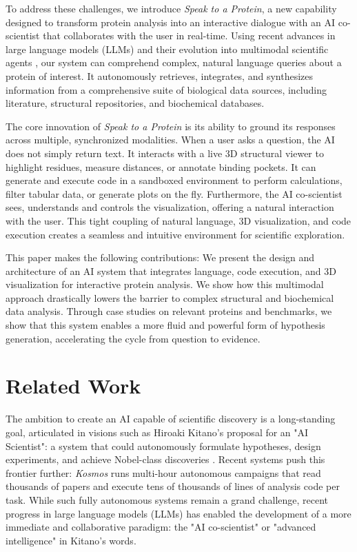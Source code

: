 \documentclass[journal=jcisd8,manuscript=article]{achemso}
\begin{document}
To address these challenges, we introduce \emph{Speak to a Protein}, a new capability designed to transform protein analysis into an interactive dialogue with an AI co-scientist that collaborates with the user in real-time. Using recent advances in large language models (LLMs) and their evolution into multimodal scientific agents \citep{Caffagni2024, Zhang2024, Zheng2025}, our system can comprehend complex, natural language queries about a protein of interest. It autonomously retrieves, integrates, and synthesizes information from a comprehensive suite of biological data sources, including literature, structural repositories, and biochemical databases.

The core innovation of \emph{Speak to a Protein} is its ability to ground its responses across multiple, synchronized modalities. When a user asks a question, the AI does not simply return text. It interacts with a live 3D structural viewer to highlight residues, measure distances, or annotate binding pockets. It can generate and execute code in a sandboxed environment to perform calculations, filter tabular data, or generate plots on the fly. Furthermore, the AI co-scientist sees, understands and controls the visualization, offering a natural interaction with the user. This tight coupling of natural language, 3D visualization, and code execution creates a seamless and intuitive environment for scientific exploration.

This paper makes the following contributions: We present the design and architecture of an AI system that integrates language, code execution, and 3D visualization for interactive protein analysis. We show how this multimodal approach drastically lowers the barrier to complex structural and biochemical data analysis. Through case studies on relevant proteins and benchmarks, we show that this system enables a more fluid and powerful form of hypothesis generation, accelerating the cycle from question to evidence.

\section{Related Work}\label{sec:related}
The ambition to create an AI capable of scientific discovery is a long-standing goal, articulated in visions such as Hiroaki Kitano's proposal for an "AI Scientist": a system that could autonomously formulate hypotheses, design experiments, and achieve Nobel-class discoveries \citep{kitano2021}. Recent systems push this frontier further: \emph{Kosmos} \citep{mitchener2025kosmos} runs multi-hour autonomous campaigns that read thousands of papers and execute tens of thousands of lines of analysis code per task. While such fully autonomous systems \citep{boiko2023autonomous, zou2025agente, mitchener2025kosmos} remain a grand challenge, recent progress in large language models (LLMs) has enabled the development of a more immediate and collaborative paradigm: the "AI co-scientist" \citep{gottweis2025coscientist} or "advanced intelligence" in Kitano's words.
\end{document}
